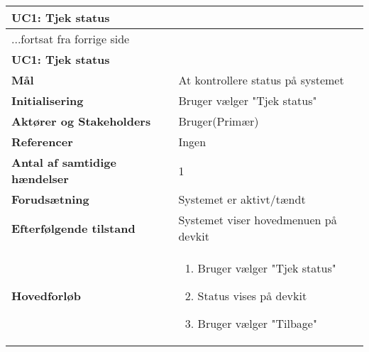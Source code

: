 \begin{center} \centering
	\begin{longtable}{|p{6cm}|p{8cm}|}  %
	\hline
		\multicolumn{2}{|l|}{\textbf{UC1: Tjek status}} \\\hline %
		\endfirsthead
		
		\multicolumn{2}{l}{...fortsat fra forrige side} \\ \hline %
		\multicolumn{2}{|l|}{\textbf{UC1: Tjek status}} \\\hline %
		\endhead	
		
		\textbf{Mål}								&At kontrollere status på systemet			\\\hline
		\textbf{Initialisering}					&Bruger vælger "Tjek status"			\\\hline
		\textbf{Aktører og Stakeholders}			&Bruger(Primær)			\\\hline
		\textbf{Referencer}						&Ingen			\\\hline
		\textbf{Antal af samtidige hændelser}	&1			\\\hline
		\textbf{Forudsætning}					&Systemet er aktivt/tændt			\\\hline
		\textbf{Efterfølgende tilstand}			&Systemet viser hovedmenuen på devkit			\\\hline
		\textbf{Hovedforløb}					
			&\begin{enumerate}
	
				\item Bruger vælger "Tjek status"
				
				\item Status vises på devkit
				
				\item Bruger vælger "Tilbage"
	
			\end{enumerate}\\\hline
	\end{longtable}
	\label{UC6} 
\end{center}

